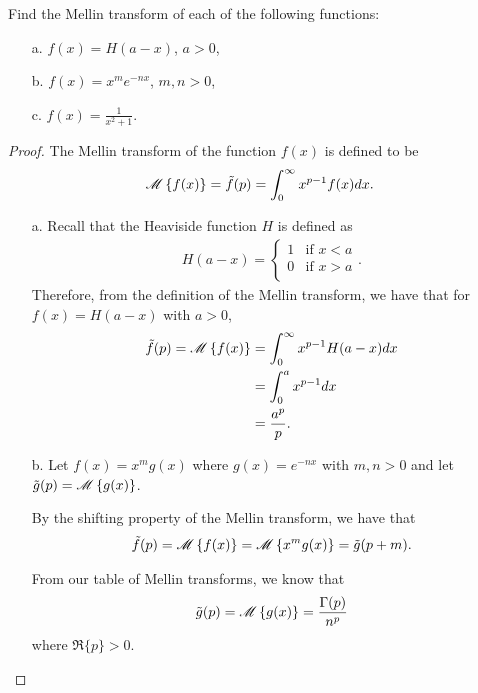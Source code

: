 \begin{problem}{8.1}
  Find the Mellin transform of each of the following functions:
  \begin{enumerate}
    \item[a.] $f(x) = H(a - x)$, $a > 0$,
    \item[b.] $f(x) = x^m e^{-nx}$, $m,n > 0$,
    \item[c.] $\displaystyle f(x) = \frac{1}{x^2 + 1}.$
  \end{enumerate}
\end{problem}

\begin{proof}
  The Mellin transform of the function $f(x)$ is defined to be
  \begin{align*}
    \mathscr{M}\left\{ {f(x)} \right\} = \tilde{f}(p) = \int_0^\infty x^{p-1} f(x) dx.
  \end{align*}

  \begin{enumerate}
    \item[a.] Recall that the Heaviside function $H$ is defined as
      \begin{align*}
        H(a-x) =
        \begin{cases}
          1 & \text{if $x < a$} \\
          0 & \text{if $x > a$} \\
        \end{cases}.
      \end{align*}
       Therefore, from the definition of the Mellin transform, we have that for
       $f(x) = H(a-x)$ with $a > 0$,
       \begin{align*}
         \tilde{f}(p) = \mathscr{M}\left\{ {f(x)} \right\} &= \int_0^\infty x^{p-1}H(a-x) dx \\
         &= \int_0^a x^{p-1} dx \\
         &= \frac{a^p}{p}.
       \end{align*}

    \item[b.] Let $f(x) = x^m g(x)$ where $g(x) = e^{-nx}$
      with $m,n > 0$ and let $\tilde{g}(p) = \mathscr{M}\left\{ {g(x)} \right\}$.

      By the shifting property of the Mellin transform, we have that
      \begin{align*}
        \tilde{f}(p) = \mathscr{M}\left\{ {f(x)} \right\} = \mathscr{M}\left\{ {x^m g(x)} \right\} = \tilde{g}(p + m).
      \end{align*}

      From our table of Mellin transforms, we know that
      \begin{align*}
        \tilde{g}(p) = \mathscr{M}\left\{ {g(x)} \right\} = \frac{\Gamma(p)}{n^p}
      \end{align*}
      where $\Re{\{p\}} > 0$.


\end{enumerate}
\end{proof}
